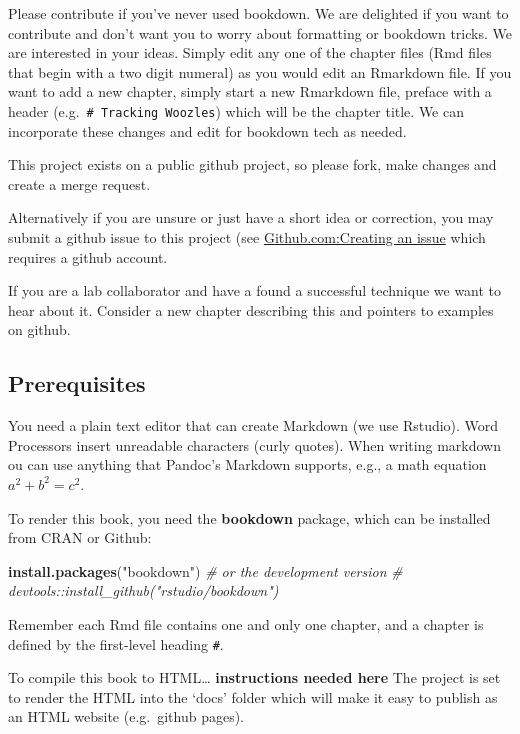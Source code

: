 \documentclass[
]{article}
\newenvironment{Shaded}{\begin{snugshade}}{\end{snugshade}}
\newcommand{\CommentTok}[1]{\textcolor[rgb]{0.56,0.35,0.01}{\textit{#1}}}
\newcommand{\KeywordTok}[1]{\textcolor[rgb]{0.13,0.29,0.53}{\textbf{#1}}}
\newcommand{\NormalTok}[1]{#1}
\newcommand{\StringTok}[1]{\textcolor[rgb]{0.31,0.60,0.02}{#1}}
\begin{document}
Please contribute if you've never used bookdown. We are delighted if you want to contribute and don't want you to worry about formatting or bookdown tricks. We are interested in your ideas. Simply edit any one of the chapter files (Rmd files that begin with a two digit numeral) as you would edit an Rmarkdown file. If you want to add a new chapter, simply start a new Rmarkdown file, preface with a header (e.g.~\texttt{\#\ Tracking\ Woozles}) which will be the chapter title. We can incorporate these changes and edit for bookdown tech as needed.

This project exists on a public github project, so please fork, make changes and create a merge request.

Alternatively if you are unsure or just have a short idea or correction, you may submit a github issue to this project (see \href{https://help.github.com/en/github/managing-your-work-on-github/creating-an-issue}{Github.com:Creating an issue} which requires a github account.

If you are a lab collaborator and have a found a successful technique we want to hear about it. Consider a new chapter describing this and pointers to examples on github.

\hypertarget{prerequisites}{%
\subsection{Prerequisites}\label{prerequisites}}

You need a plain text editor that can create Markdown (we use Rstudio). Word Processors insert unreadable characters (curly quotes). When writing markdown ou can use anything that Pandoc's Markdown supports, e.g., a math equation \(a^2 + b^2 = c^2\).

To render this book, you need the \textbf{bookdown} package, which can be installed from CRAN or Github:

\begin{Shaded}
\begin{Highlighting}[]
\KeywordTok{install.packages}\NormalTok{(}\StringTok{"bookdown"}\NormalTok{)}
\CommentTok{# or the development version}
\CommentTok{# devtools::install_github("rstudio/bookdown")}
\end{Highlighting}
\end{Shaded}

Remember each Rmd file contains one and only one chapter, and a chapter is defined by the first-level heading \texttt{\#}.

To compile this book to HTML\ldots{} \textbf{instructions needed here} The project is set to render the HTML into the `docs' folder which will make it easy to publish as an HTML website (e.g.~github pages).
\end{document}
